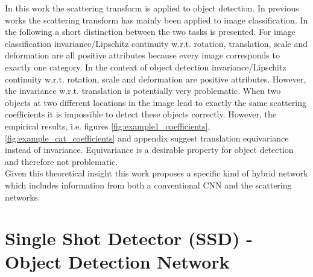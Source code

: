In this work the scattering transform is applied to object detection. In previous works the scattering transform has mainly been applied to image classification. In the following a short distinction between the two tasks is presented. For image classification invariance/Lipschitz continuity w.r.t. rotation, translation, scale and deformation are all positive attributes because every image corresponds to exactly one category. In the context of object detection invariance/Lipschitz continuity w.r.t. rotation, scale and deformation are positive attributes. However, the invariance w.r.t. translation is potentially very problematic. When two objects at two different locations in the image lead to exactly the same scattering coefficients it is impossible to detect these objects correctly. However, the empirical results, i.e. figures \ref{fig:example1_coefficients}, \ref{fig:example_cat_coefficients} and appendix suggest translation equivariance instead of invariance. Equivariance is a desirable property for object detection and therefore not problematic.\\
Given this theoretical insight this work proposes a specific kind of hybrid network which includes information from both a conventional CNN and the scattering networks. 

\section{Single Shot Detector (SSD) - Object Detection Network}

